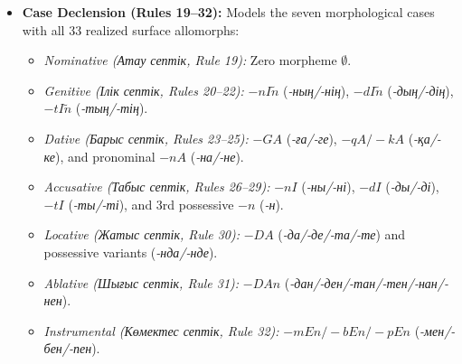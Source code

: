 \begin{itemize}
    \item \textbf{Case Declension (Rules 19--32):} Models the seven morphological cases with all 33 realized surface allomorphs:
    \begin{itemize}
        \item \textit{Nominative (Атау септік, Rule 19):} Zero morpheme $\emptyset$.
        \item \textit{Genitive (Ілік септік, Rules 20--22):} $-nI\tilde{n}$ (\textit{-ның/-нің}), $-dI\tilde{n}$ (\textit{-дың/-дің}), $-tI\tilde{n}$ (\textit{-тың/-тің}).
        \item \textit{Dative (Барыс септік, Rules 23--25):} $-GA$ (\textit{-ға/-ге}), $-qA/-kA$ (\textit{-қа/-ке}), and pronominal $-nA$ (\textit{-на/-не}).
        \item \textit{Accusative (Табыс септік, Rules 26--29):} $-nI$ (\textit{-ны/-ні}), $-dI$ (\textit{-ды/-ді}), $-tI$ (\textit{-ты/-ті}), and 3rd possessive $-n$ (\textit{-н}).
        \item \textit{Locative (Жатыс септік, Rule 30):} $-DA$ (\textit{-да/-де/-та/-те}) and possessive variants (\textit{-нда/-нде}).
        \item \textit{Ablative (Шығыс септік, Rule 31):} $-DAn$ (\textit{-дан/-ден/-тан/-тен/-нан/-нен}).
        \item \textit{Instrumental (Көмектес септік, Rule 32):} $-mEn/-bEn/-pEn$ (\textit{-мен/-бен/-пен}).
    \end{itemize}
\end{itemize}

